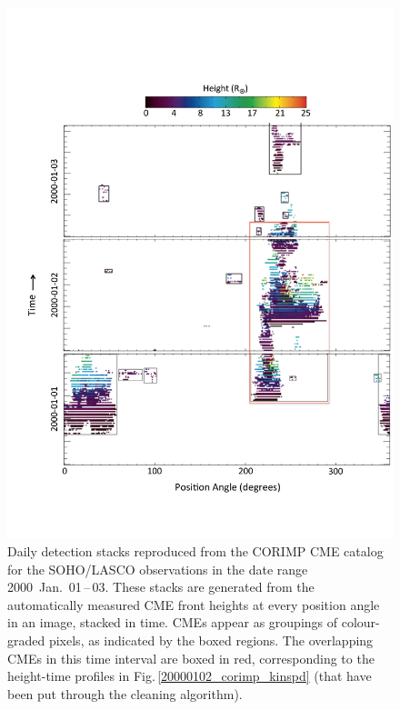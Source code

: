 \documentclass[referee,a4paper,12pt,traditabstract]{swsc}
\begin{document}
\begin{linenumbers}
\begin{figure}[t]
\centerline{\includegraphics[scale=0.5, trim=20 70 0 140, clip=true]{images/pa_total.pdf}}
\caption{Daily detection stacks reproduced from the CORIMP CME catalog for the SOHO/LASCO observations in the date range 2000~Jan.~01\,--\,03. These stacks are generated from the automatically measured CME front heights at every position angle in an image, stacked in time. CMEs appear as groupings of colour-graded pixels, as indicated by the boxed regions. The overlapping CMEs in this time interval are boxed in red, corresponding to the height-time profiles in Fig.\,\ref{20000102_corimp_kinspd} (that have been put through the cleaning algorithm).}
\label{pa_total}
\end{figure}


\end{linenumbers}
\end{document}
